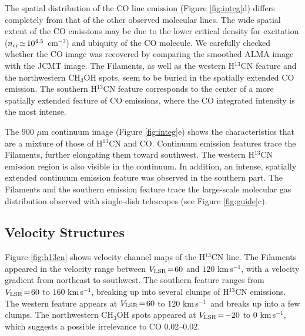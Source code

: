 \documentclass[twocolumn]{aastex631}
\newcommand\kms{\hbox{km$\,$s$^{-1}$}}
\newcommand\VLSR{\hbox{$V_{\rm LSR}$}}
\begin{document}
The spatial distribution of the CO line emission (Figure \ref{fig:integ}d) differs completely from that of the other observed molecular lines. The wide spatial extent of the CO emissions may be due to the lower critical density for excitation ($n_{\rm cr}\!\simeq\! 10^{4.5}$ cm$^{-3}$) and ubiquity of the CO molecule. We carefully checked whether the CO image was recovered by comparing the smoothed ALMA image with the JCMT image. The Filaments, as well as the western H$^{13}$CN feature and the northwestern CH$_3$OH spots, seem to be buried in the spatially extended CO emission. The southern H$^{13}$CN feature corresponds to the center of a more spatially extended feature of CO emissions, where the CO integrated intensity is the most intense.

The $900$ {\rm $\mu$m} continuum image (Figure \ref{fig:integ}e) shows the characteristics that are a mixture of those of H$^{13}$CN and CO. Continuum emission features trace the Filaments, further elongating them toward southwest. The western H$^{13}$CN emission region is also visible in the continuum. In addition, an intense, spatially extended continuum emission feature was observed in the southern part. The Filaments and the southern emission feature trace the large-scale molecular gas distribution observed with single-dish telescopes (see Figure \ref{fig:guide}c).

\begin{figure*}[htbp]
\centering
{}
\caption{Velocity channel maps of H$^{13}$CN {\it J}=4--3 line emission. The integrated velocity range is indicated at the bottom right of each panel. The synthesized beam is shown as a white ellipse in the top left panel. The white contours show the $900$ {\rm $\mu$m} continuum emission (Figure \ref{fig:integ}e). The contour levels are 3, 4, and $5$ {\rm mJy beam$^{-1}$}.
\label{fig:h13cn}}
\end{figure*}


\subsection{Velocity Structures}
\label{subsec:vel_st}
Figure \ref{fig:h13cn} shows velocity channel maps of the H$^{13}$CN line. The Filaments appeared in the velocity range between $\VLSR\! =\! 60$ and $120$ \kms , with a velocity gradient from northeast to southwest. The southern feature ranges from $\VLSR\! =\! 60$ to $160$ \kms , breaking up into several clumps of H$^{13}$CN emissions. The western feature appears at $\VLSR\! =\! 60$ to $120$ \kms\ and breaks up into a few clumps. The northwestern CH$_3$OH spots appeared at $\VLSR\! =\! -20$ to $0$ \kms , which suggests a possible irrelevance to CO 0.02--0.02.    
\end{document}
